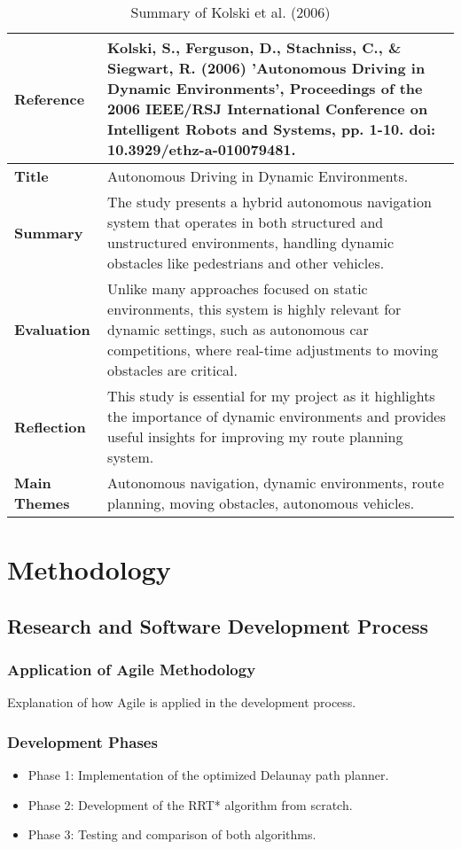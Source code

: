 \documentclass[a4paper,12pt]{report}
\begin{document}
\begin{table}[H]
    \centering
    \begin{tabular}{|p{3cm}|p{10cm}|}
        \hline
        \textbf{Reference} & Kolski, S., Ferguson, D., Stachniss, C., \& Siegwart, R. (2006) 'Autonomous Driving in Dynamic Environments', Proceedings of the 2006 IEEE/RSJ International Conference on Intelligent Robots and Systems, pp. 1-10. doi: 10.3929/ethz-a-010079481. \\ \hline
        \textbf{Title} & Autonomous Driving in Dynamic Environments. \\ \hline
        \textbf{Summary} & The study presents a hybrid autonomous navigation system that operates in both structured and unstructured environments, handling dynamic obstacles like pedestrians and other vehicles. \\ \hline
        \textbf{Evaluation} & Unlike many approaches focused on static environments, this system is highly relevant for dynamic settings, such as autonomous car competitions, where real-time adjustments to moving obstacles are critical. \\ \hline
        \textbf{Reflection} & This study is essential for my project as it highlights the importance of dynamic environments and provides useful insights for improving my route planning system. \\ \hline
        \textbf{Main Themes} & Autonomous navigation, dynamic environments, route planning, moving obstacles, autonomous vehicles. \\ \hline
    \end{tabular}
    \caption{Summary of Kolski et al. (2006)}
    \label{tab:kolski2006}
\end{table}

\chapter{Methodology}
\section{Research and Software Development Process}
\subsection{Application of Agile Methodology}
Explanation of how Agile is applied in the development process.

\subsection{Development Phases}
\begin{itemize}
    \item Phase 1: Implementation of the optimized Delaunay path planner.
    \item Phase 2: Development of the RRT* algorithm from scratch.
    \item Phase 3: Testing and comparison of both algorithms.
\end{itemize}
\end{document}
